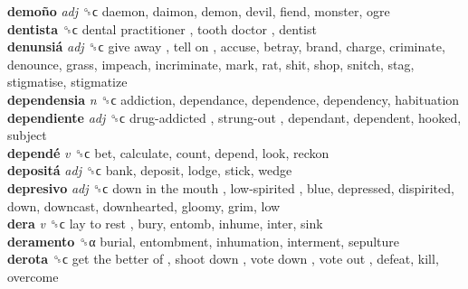 \textbf{demoño} \emph{adj}  ␝ϲ  daemon, daimon, demon, devil, fiend, monster, ogre  \\
\textbf{dentista} ␝ϲ   dental practitioner ,  tooth doctor , dentist  \\
\textbf{denunsiá} \emph{adj}  ␝ϲ   give away ,  tell on , accuse, betray, brand, charge, criminate, denounce, grass, impeach, incriminate, mark, rat, shit, shop, snitch, stag, stigmatise, stigmatize  \\
\textbf{dependensia} \emph{n}  ␝ϲ  addiction, dependance, dependence, dependency, habituation  \\
\textbf{dependiente} \emph{adj}  ␝ϲ   drug-addicted ,  strung-out , dependant, dependent, hooked, subject  \\
\textbf{dependé} \emph{v}  ␝ϲ  bet, calculate, count, depend, look, reckon  \\
\textbf{depositá} \emph{adj}  ␝ϲ  bank, deposit, lodge, stick, wedge  \\
\textbf{depresivo} \emph{adj}  ␝ϲ   down in the mouth ,  low-spirited , blue, depressed, dispirited, down, downcast, downhearted, gloomy, grim, low  \\
\textbf{dera} \emph{v}  ␝ϲ   lay to rest , bury, entomb, inhume, inter, sink  \\
\textbf{deramento} ␝α  burial, entombment, inhumation, interment, sepulture  \\
\textbf{derota} ␝ϲ   get the better of ,  shoot down ,  vote down ,  vote out , defeat, kill, overcome  \\
